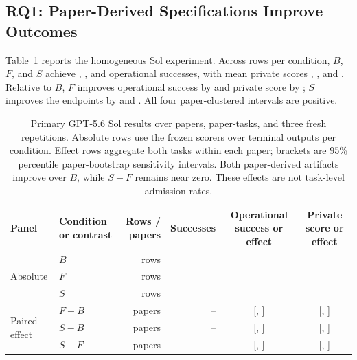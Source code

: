 \subsection{RQ1: Paper-Derived Specifications Improve Outcomes}

Table~\ref{tab:sol-primary} reports the homogeneous Sol experiment. Across \PrimaryRowsPerCondition{} rows per condition, $B$, $F$, and $S$ achieve \PrimaryBSuccess{}, \PrimaryFSuccess{}, and \PrimarySSuccess{} operational successes, with mean private scores \PrimaryBScore{}, \PrimaryFScore{}, and \PrimarySScore{}. Relative to $B$, $F$ improves operational success by \FBSuccessEffect{} and private score by \FBScoreEffect{}; $S$ improves the endpoints by \SBSuccessEffect{} and \SBScoreEffect{}. All four paper-clustered intervals are positive.

\begin{table}[t]
\centering
\small
\setlength{\tabcolsep}{5pt}
\begin{tabular}{llrrcc}
\toprule
Panel & Condition or contrast & Rows / papers & Successes & Operational success or effect & Private score or effect \\
\midrule
\multirow{3}{*}{Absolute} & $B$ & \PrimaryRowsPerCondition{} rows & \PrimaryBSuccess{} & \PrimaryBRate{} & \PrimaryBScore{} \\
& $F$ & \PrimaryRowsPerCondition{} rows & \PrimaryFSuccess{} & \PrimaryFRate{} & \PrimaryFScore{} \\
& $S$ & \PrimaryRowsPerCondition{} rows & \PrimarySSuccess{} & \PrimarySRate{} & \PrimarySScore{} \\
\midrule
\multirow{3}{*}{Paired effect} & $F-B$ & \PrimaryPapers{} papers & -- & \FBSuccessEffect{} [\FBSuccessCILow{}, \FBSuccessCIHigh{}] & \FBScoreEffect{} [\FBScoreCILow{}, \FBScoreCIHigh{}] \\
& $S-B$ & \PrimaryPapers{} papers & -- & \SBSuccessEffect{} [\SBSuccessCILow{}, \SBSuccessCIHigh{}] & \SBScoreEffect{} [\SBScoreCILow{}, \SBScoreCIHigh{}] \\
& $S-F$ & \PrimaryPapers{} papers & -- & \SFSuccessEffect{} [\SFSuccessCILow{}, \SFSuccessCIHigh{}] & \SFScoreEffect{} [\SFScoreCILow{}, \SFScoreCIHigh{}] \\
\bottomrule
\end{tabular}
\caption{Primary GPT-5.6 Sol results over \PrimaryPapers{} papers, \PrimaryTasks{} paper-tasks, and three fresh repetitions. Absolute rows use the frozen scorers over \PrimaryRowsPerCondition{} terminal outputs per condition. Effect rows aggregate both tasks within each paper; brackets are 95\% percentile paper-bootstrap sensitivity intervals. Both paper-derived artifacts improve over $B$, while $S-F$ remains near zero. These effects are not task-level admission rates.}
\label{tab:sol-primary}
\end{table}

